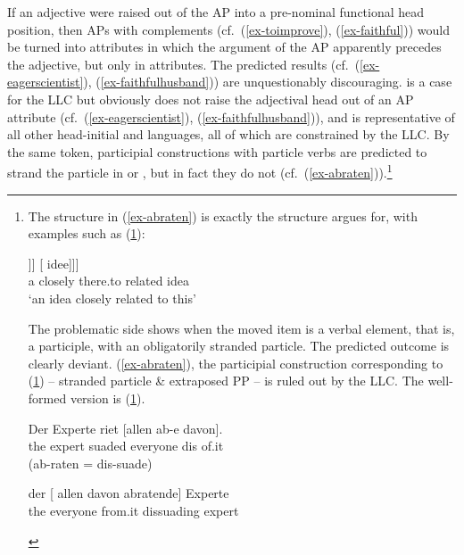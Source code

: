 \documentclass[output=paper
  ,nobabel
  ,uniformtopskip %
]{langscibook}
\begin{document}
If an adjective were raised out of the AP into a pre-nominal functional head position, then APs with complements (cf.\ (\ref{ex-toimprove}), (\ref{ex-faithful})) would be turned into attributes in which the argument of the AP apparently precedes the adjective, but only in attributes. The predicted results (cf.\ (\ref{ex-eagerscientist}), (\ref{ex-faithfulhusband})) are unquestionably discouraging.  is a case for the LLC but  obviously does not raise the adjectival head out of an AP attribute (cf.\ (\ref{ex-eagerscientist}), (\ref{ex-faithfulhusband})), and  is representative of all other head-initial  and  languages, all of which are constrained by the LLC. By the same token, participial constructions with particle verbs are predicted to strand the particle in  or , but in fact they do not (cf.\ (\ref{ex-abraten})).\footnote{
The structure in (\ref{ex-abraten}) is exactly the structure \citet[350]{Corver1997} argues for, with examples such as (\ref{ex-daaraan}):

\ea\label{ex-daaraan}
\gll [\sub{DP} een {[\sub{NP} [\sub{AgrP} PRO [\sub{Agr$'$}} [nauw t\textsubscript{i} daaraan] [\sub{Agr} verwante\textsubscript{i}]]] [ idee]]]\\
{} a {} \spacebr{}closely {} there.to {} related {} idea\\
\glt `an idea closely related to this'
\z

\noindent
The problematic side shows when the moved item is a verbal element, that is, a participle, with an
obligatorily stranded particle. The predicted outcome is clearly deviant. (\ref{ex-abraten}), the participial construction corresponding to (\ref{ex-perte}) – stranded particle \& extraposed PP – is ruled out by the LLC. The well-formed version is (\ref{ex-dissuading}).

\begin{exe}
\ex\label{ex-perte}
\gll Der Experte riet [allen ab-e davon]. \\
     the expert suaded \spacebr{}everyone dis of.it\\ (ab-raten = dis-suade)

\ex\label{ex-dissuading}
\gll der [ allen davon abratende] Experte \\
     the {}        everyone from.it dissuading expert\\
\end{exe}\vspace{-\baselineskip}
}
\end{document}
